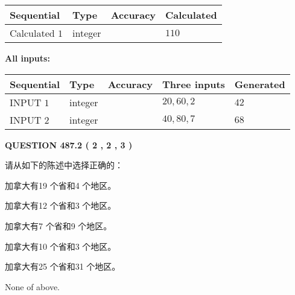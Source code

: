 \documentclass{ctexart}
\begin{document}
   
   
   
\noindent{}
   
   
  
  
\noindent\begin{tabular}{|l|l|l|l|}
\hline
 Sequential & Type & Accuracy & Calculated \\ 
\hline
 
 
  Calculated $  1 $ & integer &  & 
  $ 110 $ 
 \\  \hline  
 \end{tabular}
   
   
   
   
\noindent\vspace{0.1in}\hspace{-0.08in} {\textbf{\Large{All inputs: }}}
   
   
  
  
\noindent\begin{tabular}{|l|l|l|l|l|}
\hline
 Sequential & Type & Accuracy & Three inputs & Generated \\ 
\hline
 
 
  INPUT $  1 $ & integer &  & $
 20
 , 
 60
 , 
 2
 $ & $ 42 $ 
 \\  \hline  
 
 
  INPUT $  2 $ & integer &  & $
 40
 , 
 80
 , 
 7
 $ & $ 68 $ 
 \\  \hline  
 \end{tabular}
   
   
  
\vspace{0.2in}
  
{\textbf{\Large{QUESTION
487.2 
 ( 2 , 2 , 3 )
}}}
  
  
请从如下的陈述中选择正确的：
 
 
加拿大有19 个省和4 个地区。
 
 
加拿大有12 个省和3 个地区。
 
 
加拿大有7 个省和9 个地区。
 
 
加拿大有10 个省和3 个地区。
 
 
加拿大有25 个省和31 个地区。
 
 
 None of above.
 
 
\noindent{}
 
\end{document}
